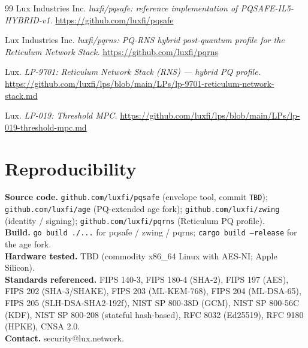 \documentclass[11pt,a4paper]{article}
\begin{document}
\begin{thebibliography}{99}
Lux Industries Inc. \emph{luxfi/pqsafe: reference implementation of
PQSAFE-IL5-HYBRID-v1.}
\url{https://github.com/luxfi/pqsafe}

Lux Industries Inc. \emph{luxfi/pqrns: PQ-RNS hybrid post-quantum
profile for the Reticulum Network Stack.}
\url{https://github.com/luxfi/pqrns}

Lux. \emph{LP-9701: Reticulum Network Stack (RNS) — hybrid PQ profile.}
\url{https://github.com/luxfi/lps/blob/main/LPs/lp-9701-reticulum-network-stack.md}

Lux. \emph{LP-019: Threshold MPC.}
\url{https://github.com/luxfi/lps/blob/main/LPs/lp-019-threshold-mpc.md}

\end{thebibliography}

\appendix
\section*{Reproducibility}
\textbf{Source code.} \texttt{github.com/luxfi/pqsafe} (envelope tool, commit \texttt{TBD}); \texttt{github.com/luxfi/age} (PQ-extended age fork); \texttt{github.com/luxfi/zwing} (identity / signing); \texttt{github.com/luxfi/pqrns} (Reticulum PQ profile).\\
\textbf{Build.} \texttt{go build ./...} for pqsafe / zwing / pqrns; \texttt{cargo build --release} for the age fork.\\
\textbf{Hardware tested.} TBD (commodity x86\_64 Linux with AES-NI; Apple Silicon).\\
\textbf{Standards referenced.} FIPS 140-3, FIPS 180-4 (SHA-2), FIPS 197 (AES), FIPS 202 (SHA-3/SHAKE), FIPS 203 (ML-KEM-768), FIPS 204 (ML-DSA-65), FIPS 205 (SLH-DSA-SHA2-192f), NIST SP 800-38D (GCM), NIST SP 800-56C (KDF), NIST SP 800-208 (stateful hash-based), RFC 8032 (Ed25519), RFC 9180 (HPKE), CNSA 2.0.\\
\textbf{Contact.} security@lux.network.
\end{document}

